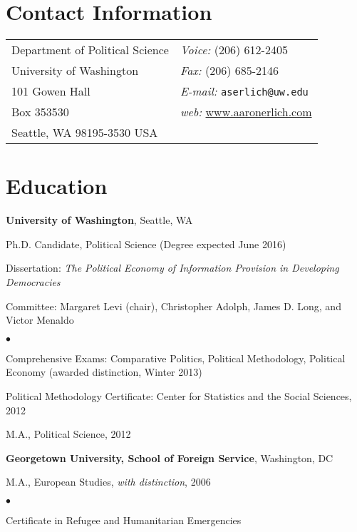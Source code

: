 \documentclass[margin,line]{res}
\newenvironment{list1}{
  \begin{list}{\ding{113}}{%
      \setlength{\itemsep}{0in}
      \setlength{\parsep}{0in} \setlength{\parskip}{0in}
      \setlength{\topsep}{0in} \setlength{\partopsep}{0in} 
      \setlength{\leftmargin}{0.17in}}}{\end{list}}
\newenvironment{list2}{
  \begin{list}{$\bullet$}{%
      \setlength{\itemsep}{0in}
      \setlength{\parsep}{0in} \setlength{\parskip}{0in}
      \setlength{\topsep}{0in} \setlength{\partopsep}{0in} 
      \setlength{\leftmargin}{0.2in}}}{\end{list}}
\begin{document}
{\name{\textcolor{Maroon}{\LARGE	Aaron S. Erlich} \vspace*{.1in}}

\begin{resume}
\section{\sc Contact Information}
\vspace{.05in}
\begin{tabular}{@{}p{2in}p{4in}}
Department of Political Science        &    {\it Voice:}  (206) 612-2405 \\            
University of Washington   &    {\it Fax:}    (206) 685-2146\\         
101 Gowen Hall   & {\it E-mail:} \texttt{aserlich@uw.edu}\\       
Box 353530  &    {\it web:} \url{www.aaronerlich.com} \\     
Seattle, WA 98195-3530 USA &
\end{tabular}


\section{\sc Education}
{\bf University of Washington}, Seattle, WA\\
\vspace*{-.1in}
\begin{list1}
\item[] Ph.D. Candidate, Political Science (Degree expected June 2016)
 \item[]Dissertation: \emph{The Political Economy of Information
     Provision in Developing Democracies}
\item[]Committee: Margaret Levi (chair), Christopher Adolph, James
 D. Long, and Victor Menaldo
\begin{list2}
 \item[] Comprehensive Exams: Comparative Politics, Political
   Methodology, Political Economy (awarded distinction, Winter 2013)
\item[] Political Methodology Certificate: Center for Statistics and the Social Sciences, 2012
\end{list2}
\item[] M.A., Political Science, 2012
\end{list1}

{\bf Georgetown University, School of Foreign Service}, Washington, DC \\
\vspace*{-.1in}
\begin{list1}
\item[] M.A., European Studies, \emph{with distinction},  2006
  \begin{list2}
\item[] Certificate in Refugee and Humanitarian Emergencies


\end{list2}
\end{list1}
\end{resume}}
\end{document}
